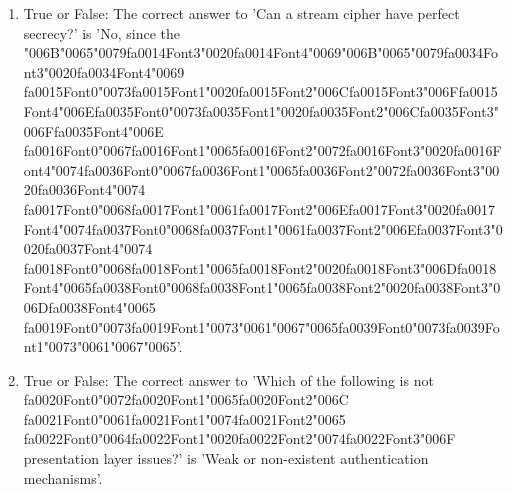\documentclass[12pt]{article}
\begin{document}
\begin{enumerate}[label=\arabic*.]
\item True or False: The correct answer to 'Can a stream cipher have perfect secrecy?' is 'No, since the {\char"006B}{\char"0065}{\char"0079}{\csname fa0014Font3\endcsname\char"0020}{\csname fa0014Font4\endcsname\char"0069}{\char"006B}{\char"0065}{\char"0079}{\csname fa0034Font3\endcsname\char"0020}{\csname fa0034Font4\endcsname\char"0069} {\csname fa0015Font0\endcsname\char"0073}{\csname fa0015Font1\endcsname\char"0020}{\csname fa0015Font2\endcsname\char"006C}{\csname fa0015Font3\endcsname\char"006F}{\csname fa0015Font4\endcsname\char"006E}{\csname fa0035Font0\endcsname\char"0073}{\csname fa0035Font1\endcsname\char"0020}{\csname fa0035Font2\endcsname\char"006C}{\csname fa0035Font3\endcsname\char"006F}{\csname fa0035Font4\endcsname\char"006E} {\csname fa0016Font0\endcsname\char"0067}{\csname fa0016Font1\endcsname\char"0065}{\csname fa0016Font2\endcsname\char"0072}{\csname fa0016Font3\endcsname\char"0020}{\csname fa0016Font4\endcsname\char"0074}{\csname fa0036Font0\endcsname\char"0067}{\csname fa0036Font1\endcsname\char"0065}{\csname fa0036Font2\endcsname\char"0072}{\csname fa0036Font3\endcsname\char"0020}{\csname fa0036Font4\endcsname\char"0074} {\csname fa0017Font0\endcsname\char"0068}{\csname fa0017Font1\endcsname\char"0061}{\csname fa0017Font2\endcsname\char"006E}{\csname fa0017Font3\endcsname\char"0020}{\csname fa0017Font4\endcsname\char"0074}{\csname fa0037Font0\endcsname\char"0068}{\csname fa0037Font1\endcsname\char"0061}{\csname fa0037Font2\endcsname\char"006E}{\csname fa0037Font3\endcsname\char"0020}{\csname fa0037Font4\endcsname\char"0074} {\csname fa0018Font0\endcsname\char"0068}{\csname fa0018Font1\endcsname\char"0065}{\csname fa0018Font2\endcsname\char"0020}{\csname fa0018Font3\endcsname\char"006D}{\csname fa0018Font4\endcsname\char"0065}{\csname fa0038Font0\endcsname\char"0068}{\csname fa0038Font1\endcsname\char"0065}{\csname fa0038Font2\endcsname\char"0020}{\csname fa0038Font3\endcsname\char"006D}{\csname fa0038Font4\endcsname\char"0065} {\csname fa0019Font0\endcsname\char"0073}{\csname fa0019Font1\endcsname\char"0073}{\char"0061}{\char"0067}{\char"0065}{\csname fa0039Font0\endcsname\char"0073}{\csname fa0039Font1\endcsname\char"0073}{\char"0061}{\char"0067}{\char"0065}'.
\item True or False: The correct answer to 'Which of the following is not {\csname fa0020Font0\endcsname\char"0072}{\csname fa0020Font1\endcsname\char"0065}{\csname fa0020Font2\endcsname\char"006C} {\csname fa0021Font0\endcsname\char"0061}{\csname fa0021Font1\endcsname\char"0074}{\csname fa0021Font2\endcsname\char"0065} {\csname fa0022Font0\endcsname\char"0064}{\csname fa0022Font1\endcsname\char"0020}{\csname fa0022Font2\endcsname\char"0074}{\csname fa0022Font3\endcsname\char"006F} presentation layer issues?' is 'Weak or non-existent authentication mechanisms'.

\end{enumerate}
\end{document}
